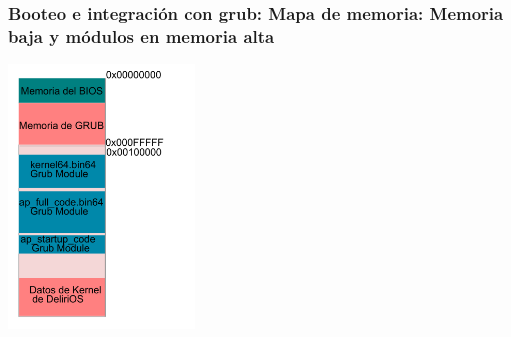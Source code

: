 \documentclass{beamer}
\begin{document}
	\begin{frame}
		\frametitle{Booteo e integración con grub: Mapa de memoria: Memoria baja y módulos en memoria alta}
		\begin{center}
			\includegraphics[height=7cm]{images/modules-map.pdf} 
		\end{center}
	\end{frame}
\end{document}
